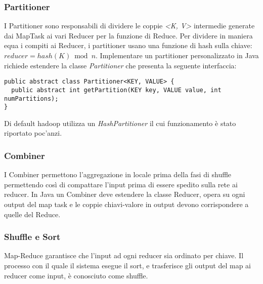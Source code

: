 \subsubsection{Partitioner}
I Partitioner sono responsabili di dividere le coppie \textit{<K, V>} intermedie generate dai MapTask ai vari Reducer per la funzione di Reduce. Per dividere in maniera equa i compiti ai Reducer, i partitioner usano una funzione di hash sulla chiave: $reducer = hash(K) \bmod n$. Implementare un partitioner personalizzato in Java richiede estendere la classe \textit{Partitioner} che presenta la seguente interfaccia:
\begin{lstlisting}
public abstract class Partitioner<KEY, VALUE> {
  public abstract int getPartition(KEY key, VALUE value, int numPartitions);
}
\end{lstlisting}
Di default hadoop utilizza un \textit{HashPartitioner} il cui funzionamento è stato riportato poc'anzi.
\subsubsection{Combiner}
I Combiner permettono l'aggregazione in locale prima della fasi di shuffle permettendo così di compattare l'input prima di essere spedito sulla rete ai reducer. In Java un Combiner deve estendere la classe Reducer, opera su ogni output del map task e le coppie chiavi-valore in output devono corrispondere a quelle del Reduce.
\subsubsection{Shuffle e Sort}
Map-Reduce garantisce che l'input ad ogni reducer sia ordinato per chiave. Il processo con il quale il sistema esegue il sort, e trasferisce gli output del map ai reducer come input, è conosciuto come shuffle.

